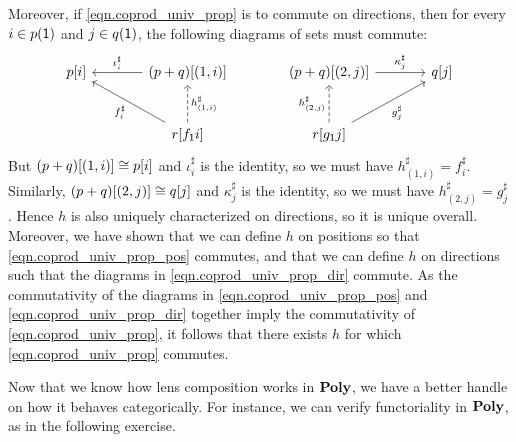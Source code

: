 \documentclass[Book-Poly]{subfiles}
\begin{document}
\begin{exercise}
\begin{solution}
Moreover, if \eqref{eqn.coprod_univ_prop} is to commute on directions, then for every $i\in p(\textsf{1})$ and $j \in q(\textsf{1})$, the following diagrams of sets must commute:
\begin{equation} \label{eqn.coprod_univ_prop_dir}
\begin{tikzcd}[sep=large]
	p[i] & (p+q)[(1,i)] \ar[l, "\iota^\sharp_i"'] & (p+q)[(2,j)] \ar[r, "\kappa^\sharp_j"] & q[j] \\
	& r[f_\1i] \ar[ul, "f^\sharp_i"] \ar[u, "h^\sharp_{(1,i)}"', dashed] & r[g_\1j] \ar[u, "h^\sharp_{(2,j)}", dashed] \ar[ur, "g^\sharp_j"']
\end{tikzcd}
\end{equation}
But $(p+q)[(1,i)] \cong p[i]$ and $\iota^\sharp_i$ is the identity, so we must have $h^\sharp_{(1,i)} = f^\sharp_i$.
Similarly, $(p+q)[(2,j)] \cong q[j]$ and $\kappa^\sharp_j$ is the identity, so we must have $h^\sharp_{(2,j)} = g^\sharp_j$.
Hence $h$ is also uniquely characterized on directions, so it is unique overall.
Moreover, we have shown that we can define $h$ on positions so that \eqref{eqn.coprod_univ_prop_pos} commutes, and that we can define $h$ on directions such that the diagrams in \eqref{eqn.coprod_univ_prop_dir} commute.
As the commutativity of the diagrams in \eqref{eqn.coprod_univ_prop_pos} and \eqref{eqn.coprod_univ_prop_dir} together imply the commutativity of \eqref{eqn.coprod_univ_prop}, it follows that there exists $h$ for which \eqref{eqn.coprod_univ_prop} commutes.
\end{solution}
\end{exercise}

Now that we know how lens composition works in $\mathbf{Poly}$, we have a better handle on how it behaves categorically.
For instance, we can verify functoriality in $\mathbf{Poly}$, as in the following exercise.
\end{document}
